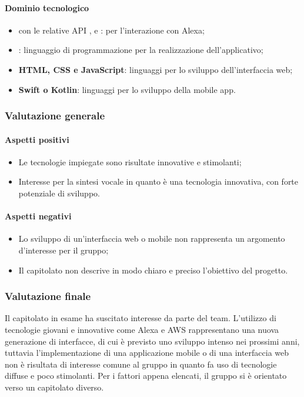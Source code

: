 \paragraph{Dominio tecnologico}
\begin{itemize}
	\item {\textbf{} con le relative API  ,  e : per l’interazione con Alexa};
	\item  \textbf{}: linguaggio di programmazione per la realizzazione dell’applicativo;
	\item \textbf{HTML, CSS e JavaScript}: linguaggi per lo sviluppo dell’interfaccia web;
	\item  \textbf{Swift o Kotlin}: linguaggi per lo sviluppo della mobile app.
\end{itemize}
\subsubsection{Valutazione generale}
\paragraph{Aspetti positivi}
\begin{itemize}
	\item{Le tecnologie impiegate sono risultate innovative e stimolanti;}
	\item{Interesse per la sintesi vocale in quanto è una tecnologia innovativa, con forte potenziale di sviluppo.}
\end{itemize}
\paragraph{Aspetti negativi}
\begin{itemize}
	\item{Lo sviluppo di un'interfaccia web o mobile non rappresenta un argomento d'interesse per il gruppo;}
	\item{Il capitolato non descrive in modo chiaro e preciso l'obiettivo del progetto.}
\end{itemize}
\subsubsection{Valutazione finale} \Spazio
Il capitolato in esame ha suscitato interesse da parte del team. L'utilizzo di tecnologie giovani e innovative come Alexa e AWS rappresentano una nuova generazione di interfacce, di cui è previsto uno sviluppo intenso nei prossimi anni, tuttavia l'implementazione di una applicazione mobile o di una interfaccia web non è risultata di interesse comune al gruppo in quanto fa uso di tecnologie diffuse e poco stimolanti.
Per i fattori appena elencati, il gruppo si è orientato verso un capitolato diverso.

